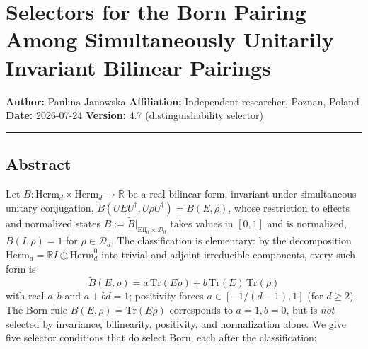 \documentclass[
]{article}
\author{}
\date{}
\begin{document}
\section{Selectors for the Born Pairing Among Simultaneously Unitarily
Invariant Bilinear
Pairings}\label{selectors-for-the-born-pairing-among-simultaneously-unitarily-invariant-bilinear-pairings}

\textbf{Author:} Paulina Janowska \textbf{Affiliation:} Independent
researcher, Poznan, Poland \textbf{Date:} 2026-07-24 \textbf{Version:}
4.7 (distinguishability selector)

\begin{center}\rule{0.5\linewidth}{0.5pt}\end{center}

\subsection{Abstract}\label{abstract}

Let \(\widetilde B:\mathrm{Herm}_d\times\mathrm{Herm}_d\to\mathbb R\) be
a real-bilinear form, invariant under simultaneous unitary conjugation,
\(\widetilde B(UEU^\dagger,U\rho U^\dagger)=\widetilde B(E,\rho)\),
whose restriction to effects and normalized states
\(B:=\widetilde B|_{\mathrm{Eff}_d\times\mathcal D_d}\) takes values in
\([0,1]\) and is normalized, \(B(I,\rho)=1\) for
\(\rho\in\mathcal D_d\). The classification is elementary: by the
decomposition \(\mathrm{Herm}_d=\mathbb RI\oplus\mathrm{Herm}_d^0\) into
trivial and adjoint irreducible components, every such form is
\[\widetilde B(E,\rho)=a\,\mathrm{Tr}(E\rho)+b\,\mathrm{Tr}(E)\,\mathrm{Tr}(\rho)\]
with real \(a,b\) and \(a+bd=1\); positivity forces \(a\in[-1/(d-1),1]\)
(for \(d\geq 2\)). The Born rule \(B(E,\rho)=\mathrm{Tr}(E\rho)\)
corresponds to \(a=1,b=0\), but is \emph{not} selected by invariance,
bilinearity, positivity, and normalization alone. We give five selector
conditions that do select Born, each after the classification:
\end{document}
